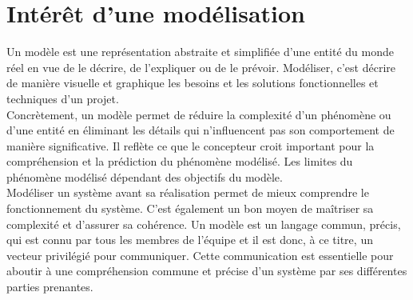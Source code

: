 
\section{Intérêt d'une modélisation}
Un modèle est une représentation abstraite et simplifiée d'une entité du monde réel en vue de le décrire, de l'expliquer ou de le prévoir. Modéliser, c’est décrire de manière visuelle et graphique les besoins et les solutions fonctionnelles et techniques d'un projet.\\
Concrètement, un modèle permet de réduire la complexité d'un phénomène ou d'une entité en éliminant les détails qui n'influencent pas son comportement de manière significative. Il reflète ce que le concepteur croit important pour la compréhension et la prédiction du phénomène modélisé. Les limites du phénomène modélisé dépendant des objectifs du modèle.\\
Modéliser un système avant sa réalisation permet de mieux comprendre le fonctionnement du système. C’est également un bon moyen de maîtriser sa complexité et d’assurer sa cohérence. Un modèle est un langage commun, précis, qui est connu par tous les membres de l’équipe et il est donc, à ce titre, un vecteur privilégié pour communiquer. Cette communication est essentielle pour aboutir à une compréhension commune  et précise d'un système par ses différentes parties prenantes.


